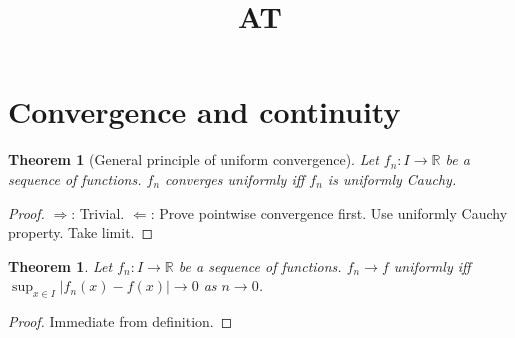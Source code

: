 \documentclass{article}
\title{AT}
\author{ }
\date{ }
\theoremstyle{definition}
\theoremstyle{remark}
\theoremstyle{plain}
\newtheorem{thm}[defn]{Theorem}
\theoremstyle{definition}
\newcommand{\RR}{\mathbb{R}}
\begin{document}
\maketitle
\section{Convergence and continuity}
\begin{thm}[General principle of uniform convergence]
    Let $f_n:I\to\RR$ be a sequence of functions. $f_n$ converges uniformly iff $f_n$ is uniformly Cauchy. 
\end{thm}
\begin{proof}
    $\Rightarrow$: Trivial. $\Leftarrow$: Prove pointwise convergence first. Use uniformly Cauchy property. Take limit. 
\end{proof}
\begin{thm}
    Let $f_n:I\to\RR$ be a sequence of functions. $f_n\to f$ uniformly iff $\sup_{x\in I}|f_n(x)-f(x)|\to 0$ as $n\to 0$.
\end{thm}
\begin{proof}
    Immediate from definition.
\end{proof}
\end{document}
